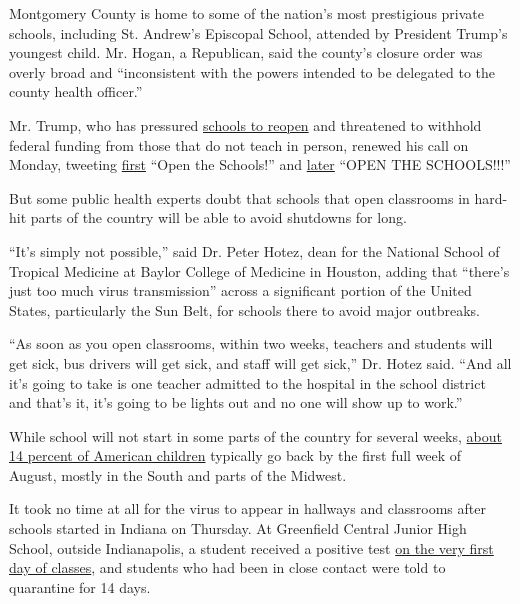 Montgomery County is home to some of the nation's most prestigious
private schools, including St. Andrew's Episcopal School, attended by
President Trump's youngest child. Mr. Hogan, a Republican, said the
county's closure order was overly broad and ``inconsistent with the
powers intended to be delegated to the county health officer.''

Mr. Trump, who has pressured
\href{https://www.nytimes3xbfgragh.onion/2020/08/03/business/how-schools-reopen.html}{schools
to reopen} and threatened to withhold federal funding from those that do
not teach in person, renewed his call on Monday, tweeting
\href{https://twitter.com/realDonaldTrump/status/1290257055534551043}{first}
``Open the Schools!'' and
\href{https://twitter.com/realDonaldTrump/status/1290488364362170371}{later}
``OPEN THE SCHOOLS!!!''

But some public health experts doubt that schools that open classrooms
in hard-hit parts of the country will be able to avoid shutdowns for
long.

``It's simply not possible,'' said Dr. Peter Hotez, dean for the
National School of Tropical Medicine at Baylor College of Medicine in
Houston, adding that ``there's just too much virus transmission'' across
a significant portion of the United States, particularly the Sun Belt,
for schools there to avoid major outbreaks.

``As soon as you open classrooms, within two weeks, teachers and
students will get sick, bus drivers will get sick, and staff will get
sick,'' Dr. Hotez said. ``And all it's going to take is one teacher
admitted to the hospital in the school district and that's it, it's
going to be lights out and no one will show up to work.''

While school will not start in some parts of the country for several
weeks,
\href{https://www.pewresearch.org/fact-tank/2019/08/14/back-to-school-dates-u-s/}{about
14 percent of American children} typically go back by the first full
week of August, mostly in the South and parts of the Midwest.

It took no time at all for the virus to appear in hallways and
classrooms after schools started in Indiana on Thursday. At Greenfield
Central Junior High School, outside Indianapolis, a student received a
positive test
\href{https://www.nytimes3xbfgragh.onion/2020/08/01/us/schools-reopening-indiana-coronavirus.html}{on
the very first day of classes}, and students who had been in close
contact were told to quarantine for 14 days.

